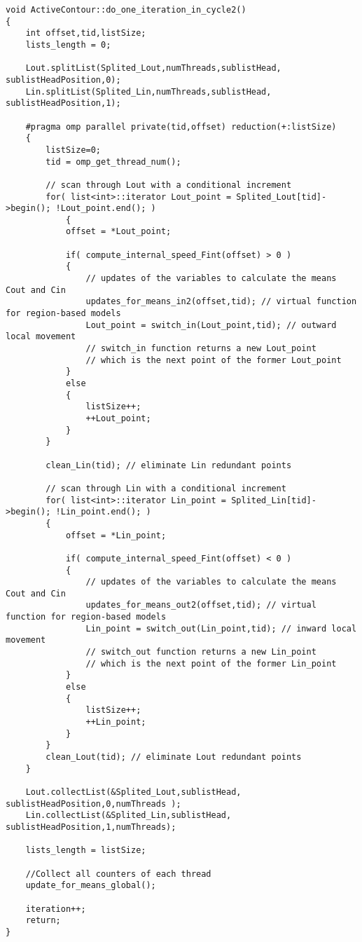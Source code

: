 \begin{lstlisting}
void ActiveContour::do_one_iteration_in_cycle2()
{
	int offset,tid,listSize;
	lists_length = 0;
	
	Lout.splitList(Splited_Lout,numThreads,sublistHead, sublistHeadPosition,0);
	Lin.splitList(Splited_Lin,numThreads,sublistHead, sublistHeadPosition,1);
	
	#pragma omp parallel private(tid,offset) reduction(+:listSize)
	{
		listSize=0;
		tid = omp_get_thread_num();
		
		// scan through Lout with a conditional increment
		for( list<int>::iterator Lout_point = Splited_Lout[tid]->begin(); !Lout_point.end(); )
			{
			offset = *Lout_point;
			
			if( compute_internal_speed_Fint(offset) > 0 )
			{
				// updates of the variables to calculate the means Cout and Cin
				updates_for_means_in2(offset,tid); // virtual function for region-based models
				Lout_point = switch_in(Lout_point,tid); // outward local movement
				// switch_in function returns a new Lout_point
				// which is the next point of the former Lout_point
			}
			else
			{
				listSize++;
				++Lout_point;
			}
		}
		
		clean_Lin(tid); // eliminate Lin redundant points
		
		// scan through Lin with a conditional increment
		for( list<int>::iterator Lin_point = Splited_Lin[tid]->begin(); !Lin_point.end(); )
		{
			offset = *Lin_point;
			
			if( compute_internal_speed_Fint(offset) < 0 )
			{
				// updates of the variables to calculate the means Cout and Cin
				updates_for_means_out2(offset,tid); // virtual function for region-based models
				Lin_point = switch_out(Lin_point,tid); // inward local movement
				// switch_out function returns a new Lin_point
				// which is the next point of the former Lin_point
			}
			else
			{
				listSize++;
				++Lin_point;
			}
		}
		clean_Lout(tid); // eliminate Lout redundant points
	}
	
	Lout.collectList(&Splited_Lout,sublistHead, sublistHeadPosition,0,numThreads );
	Lin.collectList(&Splited_Lin,sublistHead, sublistHeadPosition,1,numThreads);
	
	lists_length = listSize;
	
	//Collect all counters of each thread
	update_for_means_global();
	
	iteration++;
	return;
}
\end{lstlisting}

